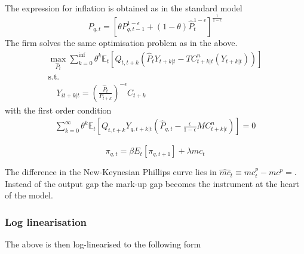 \documentclass[12pt,a4paper,english]{article} %
\newcommand{\E}{\mathbb{E}} %
\begin{document}
	The expression for inflation is obtained as in the standard model
	\begin{equation}
		P_{q,t} = 
		\left[ 
		\theta P_{q,t-1}^{1 - \epsilon} + (1 - \theta) \hat{P}_t^{1 - \epsilon}
		\right]^{\frac{1}{1 - \epsilon}}
	\end{equation}
	The firm solves the same optimisation problem as in the above. 
		\begin{equation}
		\begin{aligned}
			\max_{\hat{P}_t}
			\sum_{k=0}^{\inf} \theta^k \E_t 
			\left[
			Q_{t, t+k} 
			\left(
			\hat{P}_t Y_{t+k|t} - TC_{t+k|t}^n(Y_{t+k|t})
			\right)
			\right] \\
			\textrm{s.t.}\\
			\quad
			Y_{it+k|t} = \left(\frac{\hat{P}_t}{P_{t+k}} \right)^{-\epsilon} C_{t+k}
		\end{aligned}
	\end{equation}
	with the first order condition 
	\begin{equation}
		\begin{aligned}
			\sum_{k=0}^{\infty} \theta^k \E_t 
			\left[
			Q_{t,t+k} Y_{q,t+k|t} 
			\left(
			\hat{P}_{q,t} - \frac{\epsilon}{1 - \epsilon} MC_{t+k|t}^n
			\right)
			\right]
			= 0
		\end{aligned}
	\end{equation}
	
	\begin{equation}
		\pi_{q,t} = \beta E_t [\pi_{q,t+1}] + \lambda \hat{mc}_{t}
	\end{equation}
	
	The difference in the New-Keynesian Phillips curve lies in $\hat{mc}_t \equiv mc_t^p - mc^p = $. Instead of the output gap the mark-up gap becomes the instrument at the heart of the model.
	
	\subsubsection{Log linearisation}
	The above is then log-linearised to the following form
	
\end{document}
